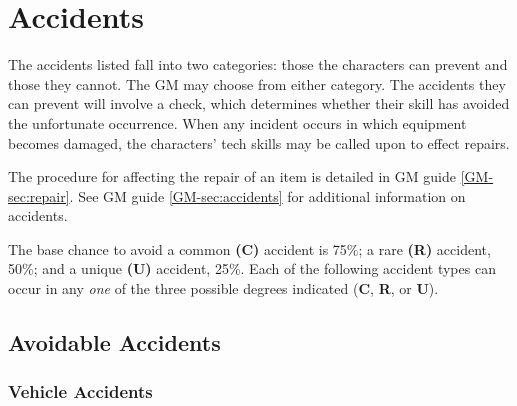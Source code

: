 \section{Accidents}
\label{sec:accidents}

The accidents listed fall into two categories: those the characters
can prevent and those they cannot. The GM may choose from either
category. The accidents they can prevent will involve a check, which
determines whether their skill has avoided the unfortunate occurrence.
When any incident occurs in which equipment becomes damaged, the
characters' tech skills may be called upon to effect repairs.

The procedure for affecting the repair of an item is detailed in GM
guide \ref{GM-sec:repair}.  See GM guide \ref{GM-sec:accidents} for
additional information on accidents.

The base chance to avoid a common \textbf{(C)} accident is 75\%; a
rare \textbf{(R)} accident, 50\%; and a unique \textbf{(U)} accident,
25\%. Each of the following accident types can occur in any \emph{one}
of the three possible degrees indicated (\textbf{C}, \textbf{R}, or
\textbf{U}).


\subsection{Avoidable Accidents}
\label{sec:avoidable-accidents}


\subsubsection*{Vehicle Accidents}
\label{sec:vehicle-accidents}


